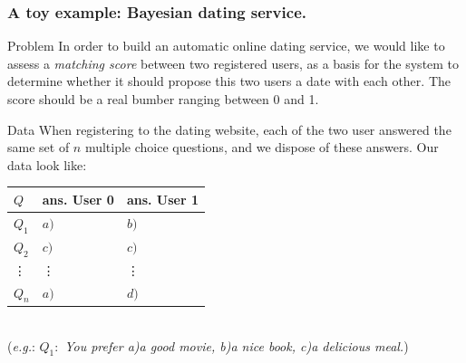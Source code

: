 \documentclass{beamer}
\begin{document}
\begin{frame}
  \frametitle{A toy example: Bayesian dating service.}
  \begin{exampleblock}{Problem}
    In order to build an automatic online dating service, we would like to assess a \emph{matching score} between two registered users, as a basis for the system to determine whether it should propose this two users a date with each other. The score should be a real bumber ranging between 0 and 1.
  \end{exampleblock}
  \begin{exampleblock}{Data}
    When registering to the dating website, each of the two user answered the same set of $n$ multiple choice questions, and we dispose of these answers. Our data look like:
    \begin{tabular}{|l|l|l|}
      \hline
      $Q$ & ans. User 0 & ans. User 1\\
      \hline
      $Q_1$ & $a)$ & $b)$\\
      $Q_2$ & $c)$ & $c)$\\
      \vdots & \vdots & \vdots\\
      $Q_n$ & $a)$ & $d)$\\
      \hline
    \end{tabular}\\
    (\emph{e.g.}: $Q_1:$ \emph{You prefer a)a good movie, b)a nice book, c)a delicious meal.}) 
  \end{exampleblock}
\end{frame}
\end{document}
